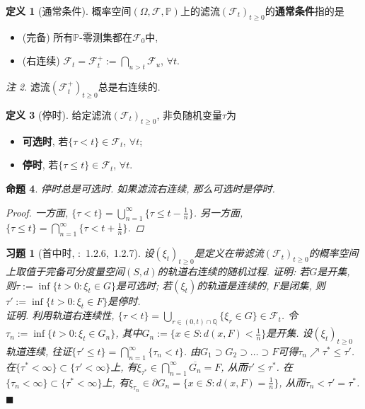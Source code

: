 \documentclass{ctexart}
\theoremstyle{definition}
\newtheorem{Def}{定义}[section]
\theoremstyle{remark}
\newtheorem{Rmk}[Def]{注}
\theoremstyle{plain}
\newtheorem{Prop}[Def]{命题}
\newtheorem{Ex}{习题}[section]
\newenvironment{Prf}{\vspace{1ex}\textbf{\\}{\color{red}\textit{证明}}.\normalfont}{\color{red}\hfill$\blacksquare$\vspace{1ex}\par}
\newcommand{\1}{\mathbbm{1}}				%
\renewcommand{\P}{\mathbb{P}}				%
\newcommand{\cl}[1]{\overline{#1}}				%
\newcommand{\Q}{\mathbb{Q}}					%
\begin{document}
\begin{Def}[通常条件]
概率空间$(\Omega,\mathscr{F},\P)$上的滤流$(\mathscr{F}_{t})_{t \ge 0}$的\textbf{通常条件}指的是
\begin{itemize}
	\item (完备) 所有$\P$-零测集都在$\mathscr{F}_{0}$中,
	\item (右连续) $\mathscr{F}_{t} = \mathscr{F}_{t}^{+} := \bigcap_{u > t} \mathscr{F}_{u}$, $\forall t$.
\end{itemize}
\end{Def}
\begin{Rmk}
滤流$(\mathscr{F}_{t}^{+})_{t \ge 0}$总是右连续的.
\end{Rmk}


\begin{Def}[停时]
给定滤流$(\mathscr{F}_{t})_{t \ge 0}$, 非负随机变量$\tau$为
\begin{itemize}
	\item \textbf{可选时}, 若$\{ \tau < t \} \in \mathscr{F}_{t}$, $\forall t$;
	\item \textbf{停时}, 若$\{ \tau \le t \} \in \mathscr{F}_{t}$, $\forall t$.
\end{itemize}
\end{Def}

\begin{Prop}
停时总是可选时. 如果滤流右连续, 那么可选时是停时.
\begin{proof}
一方面, $\{ \tau < t \} = \bigcup_{n=1}^{\infty} \{ \tau \le t - \frac{1}{n} \}$. 
另一方面, $\{ \tau \le t \} = \bigcap_{n=1}^{\infty} \{ \tau < t + \frac{1}{n} \}$. 
\end{proof}
\end{Prop}


\begin{Ex}[首中时, \cite{Karatzas-Shreve--GTM113}:~1.2.6,~1.2.7]
设$(\xi_{t})_{t \ge 0}$是定义在带滤流$(\mathscr{F}_{t})_{t \ge 0}$的概率空间上取值于完备可分度量空间$(S,d)$的轨道右连续的随机过程. 证明: 若$G$是开集, 则$\tau := \inf\{ t > 0 : \xi_{t} \in G \}$是可选时; 若$(\xi_{t})$的轨道是连续的, $F$是闭集, 则$\tau' := \inf\{ t > 0 : \xi_{t} \in F \}$是停时.
\begin{Prf}
利用轨道右连续性, $\{ \tau < t \} = \bigcup_{r \in (0,t)\cap\Q} \{ \xi_{r} \in G \} \in \mathscr{F}_{t}$. 令$\tau_{n} := \inf\{ t > 0 : \xi_{t} \in G_{n} \}$, 其中$G_{n} := \{ x \in S : d(x,F) < \frac{1}{n} \}$是开集. 设$(\xi_{t})_{t \ge 0}$轨道连续, 往证$\{ \tau' \le t \} = \bigcap_{n=1}^{\infty} \{ \tau_{n} < t \}$. 由$G_{1} \supset G_{2} \supset \dots \supset F$可得$\tau_{n} \nearrow \tau^{*} \le \tau'$. 在$\{ \tau^{*} < \infty \} \subset \{ \tau' < \infty \}$上, 有$\xi_{\tau^{*}} \in \bigcap_{n=1}^{\infty} \cl{G_{n}} = F$, 从而$\tau' \le \tau^{*}$. 在$\{ \tau_{n} < \infty \} \subset \{ \tau^{*} < \infty \}$上, 有$\xi_{\tau_{n}} \in \partial G_{n} = \{ x \in S : d(x,F) = \frac{1}{n} \}$, 从而$\tau_{n} < \tau' = \tau^{*}$.
\end{Prf}
\end{Ex}
\end{document}
